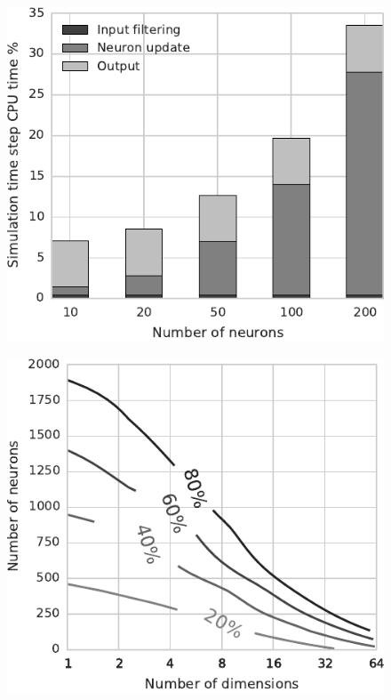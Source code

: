 \documentclass[conference]{IEEEtran}
\begin{document}
  \begin{figure}[!t]
    \includegraphics{figures/comm_channel_cpu_16d_bar}
    \caption{}
    \label{fig:results/comm-channel-cpu-16d}
  \end{figure}

  \begin{figure}[!t]
    \includegraphics{figures/comm_channel_cpu_contour}
    \caption{}
    \label{fig:results/comm-channel-cpu-contour}
  \end{figure}
  
\end{document}
